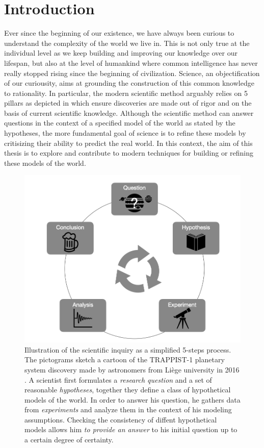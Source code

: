 \chapter{Introduction}\label{ch:introduction}
Ever since the beginning of our existence, we have always been curious to understand the complexity of the world we live in.
This is not only true at the individual level as we keep building and improving our knowledge over our lifespan,
but also at the level of humankind where common intelligence has never really stopped rising since the beginning of civilization.
Science, an objectification of our curiousity, aims at grounding the construction of this common knowledge to rationality. In particular, the modern scientific method
arguably relies on 5 pillars as depicted in  which ensure discoveries are made out of rigor and on the basis of current scientific knowledge.
Although the scientific method can answer questions in the context of a specified model of the world as stated by the hypotheses, the more fundamental goal of science is to refine these models by critisizing their ability to predict the real world. In this context, the aim of this thesis is to explore and contribute to modern techniques for building or refining these models of the world.
\begin{figure}[h]
  \centering
  \includegraphics[width=.8\textwidth]{figures/chapter01/trapist_disco.png}
  \caption{Illustration of the scientific inquiry as a simplified 5-steps process.
  The pictograms sketch a cartoon of the TRAPPIST-1 planetary system discovery made by astronomers from Li{\`e}ge university in 2016 \citep{gillon2017seven}.
  A scientist first formulates a \textit{research question} and a set of reasonable \textit{hypotheses}, together they define a class of hypothetical models of the world.
  In order to answer his question, he gathers data from \textit{experiments} and analyze them in the context of his modeling assumptions. Checking the consistency of diffent hypothetical models allows him \textit{to provide an answer} to his initial question up to a certain degree of certainty.}
  \label{fig:ch01:scientific_method}
\end{figure}


